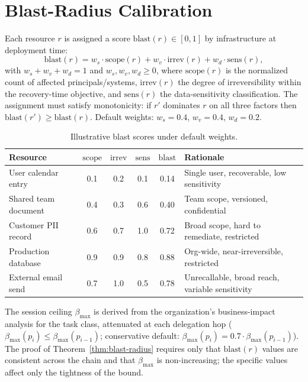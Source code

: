 \documentclass[sigconf,nonacm]{acmart}
\begin{document}
\section{Blast-Radius Calibration}\label{app:blast-calibration}

Each resource $r$ is assigned a score $\mathrm{blast}(r) \in [0,1]$ by infrastructure at deployment time:
\[
\mathrm{blast}(r) = w_s \cdot \mathrm{scope}(r) + w_v \cdot \mathrm{irrev}(r) + w_d \cdot \mathrm{sens}(r),
\]
with $w_s + w_v + w_d = 1$ and $w_s, w_v, w_d \geq 0$, where $\mathrm{scope}(r)$ is the normalized count of affected principals/systems, $\mathrm{irrev}(r)$ the degree of irreversibility within the recovery-time objective, and $\mathrm{sens}(r)$ the data-sensitivity classification. The assignment must satisfy monotonicity: if $r'$ dominates $r$ on all three factors then $\mathrm{blast}(r') \geq \mathrm{blast}(r)$. Default weights: $w_s = 0.4$, $w_v = 0.4$, $w_d = 0.2$.

\begin{table}[H]
\centering
\footnotesize
\caption{Illustrative blast scores under default weights.}
\label{tab:blast-examples}
\begin{tabularx}{\linewidth}{@{}lcccc>{\raggedright\arraybackslash}X@{}}
\toprule
\textbf{Resource} & $\mathrm{scope}$ & $\mathrm{irrev}$ & $\mathrm{sens}$ & $\mathrm{blast}$ & \textbf{Rationale} \\
\midrule
User calendar entry & 0.1 & 0.2 & 0.1 & 0.14 & Single user, recoverable, low sensitivity \\
Shared team document & 0.4 & 0.3 & 0.6 & 0.40 & Team scope, versioned, confidential \\
Customer PII record & 0.6 & 0.7 & 1.0 & 0.72 & Broad scope, hard to remediate, restricted \\
Production database & 0.9 & 0.9 & 0.8 & 0.88 & Org-wide, near-irreversible, restricted \\
External email send & 0.7 & 1.0 & 0.5 & 0.78 & Unrecallable, broad reach, variable sensitivity \\
\bottomrule
\end{tabularx}
\end{table}

The session ceiling $\beta_{\max}$ is derived from the organization's business-impact analysis for the task class, attenuated at each delegation hop ($\beta_{\max}(p_i) \leq \beta_{\max}(p_{i-1})$; conservative default: $\beta_{\max}(p_i) = 0.7 \cdot \beta_{\max}(p_{i-1})$). The proof of Theorem~\ref{thm:blast-radius} requires only that $\mathrm{blast}(r)$ values are consistent across the chain and that $\beta_{\max}$ is non-increasing; the specific values affect only the tightness of the bound.
\end{document}
